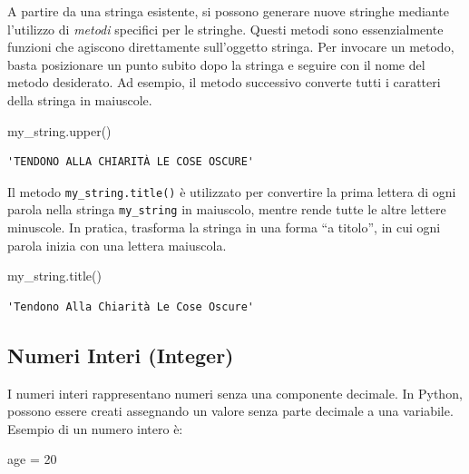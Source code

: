 \documentclass[
  letterpaper,
  krantz2]{{[}./krantz{]}}
\newenvironment{Shaded}{\begin{snugshade}}{\end{snugshade}}
\newcommand{\DecValTok}[1]{\textcolor[rgb]{0.68,0.00,0.00}{#1}}
\newcommand{\NormalTok}[1]{\textcolor[rgb]{0.00,0.23,0.31}{#1}}
\newcommand{\OperatorTok}[1]{\textcolor[rgb]{0.37,0.37,0.37}{#1}}
\begin{document}
A partire da una stringa esistente, si possono generare nuove stringhe
mediante l'utilizzo di \emph{metodi} specifici per le stringhe. Questi
metodi sono essenzialmente funzioni che agiscono direttamente
sull'oggetto stringa. Per invocare un metodo, basta posizionare un punto
subito dopo la stringa e seguire con il nome del metodo desiderato. Ad
esempio, il metodo successivo converte tutti i caratteri della stringa
in maiuscole.

\begin{Shaded}
\begin{Highlighting}[]
\NormalTok{my\_string.upper()}
\end{Highlighting}
\end{Shaded}

\begin{verbatim}
'TENDONO ALLA CHIARITÀ LE COSE OSCURE'
\end{verbatim}

Il metodo \texttt{my\_string.title()} è utilizzato per convertire la
prima lettera di ogni parola nella stringa \texttt{my\_string} in
maiuscolo, mentre rende tutte le altre lettere minuscole. In pratica,
trasforma la stringa in una forma ``a titolo'', in cui ogni parola
inizia con una lettera maiuscola.

\begin{Shaded}
\begin{Highlighting}[]
\NormalTok{my\_string.title()}
\end{Highlighting}
\end{Shaded}

\begin{verbatim}
'Tendono Alla Chiarità Le Cose Oscure'
\end{verbatim}

\subsection{Numeri Interi (Integer)}\label{numeri-interi-integer}

I numeri interi rappresentano numeri senza una componente decimale. In
Python, possono essere creati assegnando un valore senza parte decimale
a una variabile. Esempio di un numero intero è:

\begin{Shaded}
\begin{Highlighting}[]
\NormalTok{age }\OperatorTok{=} \DecValTok{20}
\end{Highlighting}
\end{Shaded}
\end{document}
